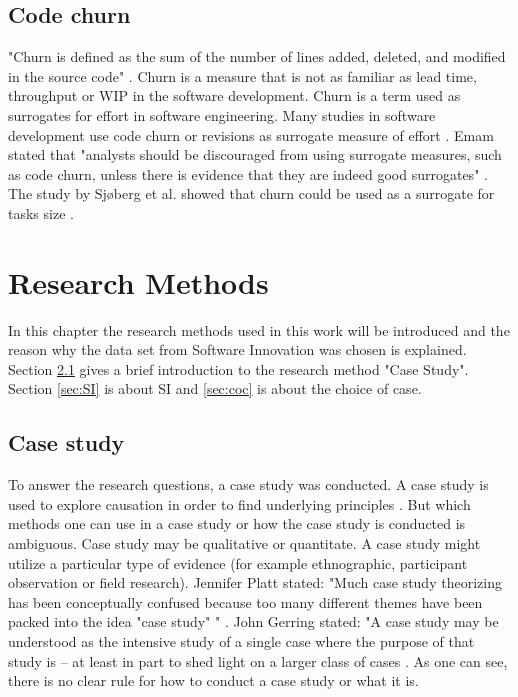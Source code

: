 \documentclass[UKenglish]{ifimaster}  %
\begin{document}
\section{Code churn}
\label{sec:Churn}
"Churn is defined as the sum of the number of lines added, deleted, and modified in the source code" \parencite{Dag}.
Churn is a measure that is not as familiar as lead time, throughput or WIP in the software development. Churn is a term used as surrogates for effort in software engineering. Many studies in software development use code churn or revisions as surrogate measure of effort \parencite{yamashita2012quantifying}. Emam stated that "analysts should be discouraged from using surrogate measures, such as code churn, unless there is evidence that they are indeed good surrogates" \parencite{el2000methodology}. The study by Sj\o berg et al. showed that churn could be used as a surrogate for tasks size \parencite{yamashita2012quantifying}. 





\chapter{Research Methods}
\label{chap:RM}
In this chapter the research methods used in this work will be introduced and the reason why the data set from Software Innovation was chosen is explained. Section \ref{sec:CS} gives a brief introduction to the research method "Case Study".  Section \ref{sec:SI} is about SI and \ref{sec:coc} is about the choice of case. 


\section{Case study}
\label{sec:CS}
To answer the research questions, a case study was conducted.  A case study is used to explore causation in order to find underlying principles \parencite{0078285763}\parencite{9781412960991}.  But which methods one can use in a case study or how the case study is conducted is ambiguous. Case study may be qualitative or quantitate.  A case study might utilize a particular type of evidence (for example ethnographic, participant observation or field research).  Jennifer Platt stated: "Much case study theorizing has been conceptually confused because too many different themes have been packed into the idea "case study" " \parencite{0521676568}.  John Gerring stated: "A case study may be understood as the intensive study of a single case where the purpose of that study is -- at least in part to shed light on a larger class of cases  \parencite{0521676568}. As one can see, there is no clear rule for how to conduct a case study or what it is. 
\end{document}
